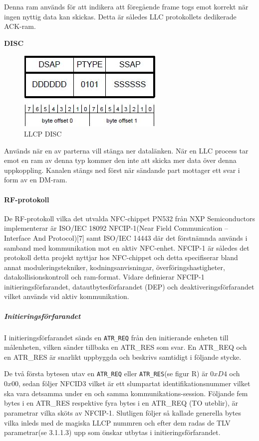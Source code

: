 \documentclass[11pt]{article}
\begin{document}
Denna ram används för att indikera att föregående frame togs emot korrekt när ingen nyttig data kan skickas. Detta är således LLC protokollets dedikerade ACK-ram.

\textbf{DISC}

\begin{figure}[H]
\centering
\includegraphics[scale=0.8]{LLCP_DISC.jpg}
\caption{LLCP DISC}
\label{fig:LLCP_DISC}
\end{figure}

Används när en av parterna vill stänga ner datalänken. När en LLC process tar emot en ram av denna typ kommer den inte att skicka mer data över denna uppkoppling. Kanalen stängs ned först när sändande part mottager ett svar i form av en DM-ram.


\paragraph{RF-protokoll}
De RF-protokoll vilka det utvalda NFC-chippet PN532 från NXP Semiconductors implementerar är ISO/IEC 18092 NFCIP-1(Near Field Communication – Interface And Protocol)[7] samt ISO/IEC 14443 där det förstnämnda används i samband med kommunikation mot en aktiv NFC-enhet. NFCIP-1 är således det protokoll detta projekt nyttjar hos NFC-chippet och detta specifiserar bland annat moduleringstekniker, kodningsanvisningar, överföringshastigheter, datakollisionskontroll och ram-format. Vidare definierar NFCIP-1 initieringsförfarandet, datautbytesförfarandet (DEP) och deaktiveringsförfarandet vilket används vid aktiv kommunikation.

\subparagraph{Initieringsförfarandet}
I initieringsförfarandet sänds en \texttt{ATR\_REQ} från den initierande enheten till målenheten, vilken sänder tillbaka en ATR\_RES som svar. En ATR\_REQ och en ATR\_RES är snarlikt uppbyggda och beskrivs samtidigt i följande stycke.

De två första bytesen utav en \texttt{ATR\_REQ} eller \texttt{ATR\_RES}(se figur R) är $0xD4$ och $0x00$, sedan följer NFCID3 vilket är ett slumpartat identifikationsnummer vilket ska vara detsamma under en och samma kommunikations-session. Följande fem bytes i en ATR\_RES respektive fyra bytes i en ATR\_REQ (TO uteblir), är parametrar vilka sköts av NFCIP-1. Slutligen följer så kallade generella bytes vilka inleds med de magiska LLCP nummren och efter dem radas de TLV parametrar(se 3.1.1.3) upp som önskar utbytas i initieringsförfarandet.
\end{document}
